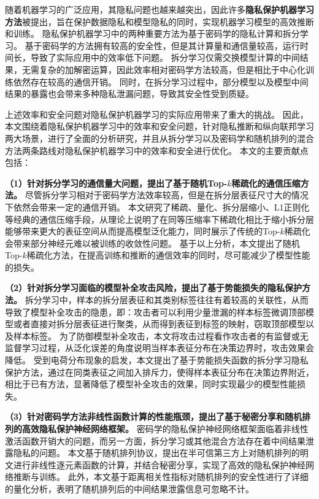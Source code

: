 \cleardoublepage
{}
随着机器学习的广泛应用，其隐私问题也越来越突出，因此许多\textbf{隐私保护机器学习方法}被提出，旨在保护数据隐私和模型隐私的同时，实现机器学习模型的高效推断和训练。
%
隐私保护机器学习中的两种重要方法为基于密码学的隐私计算和拆分学习。
基于密码学的方法拥有较高的安全性，但是其计算量和通信量较高，运行时间长，导致了实际应用中的效率低下问题。
拆分学习仅需交换模型计算的中间结果，无需复杂的加解密运算，因此效率相对密码学方法较高，但是相比于中心化训练依然存在较高的通信开销。
同时，在拆分学习过程中，部分模型以及模型中间结果的暴露也会带来多种隐私泄漏问题，导致其安全性受到质疑。
%

上述效率和安全问题对隐私保护机器学习的实际应用带来了重大的挑战。
%
因此，本文围绕着隐私保护机器学习中的效率和安全问题，针对隐私推断和纵向联邦学习两大场景，进行了全面的分析研究，并且从拆分学习以及密码学和随机排列的混合方法两条路线对隐私保护机器学习中的效率和安全进行优化。
%
本文的主要贡献点包括：


\textbf{（1）针对拆分学习的通信量大问题，提出了基于随机Top-$k$稀疏化的通信压缩方法。}
尽管拆分学习相对于密码学方法效率较高，但是在拆分层表征尺寸大的情况下依然会带来一定的通信开销。
%
本文研究了稀疏、量化、拆分层缩小、L1正则化等经典的通信压缩手段，从理论上说明了在同等压缩率下稀疏化相比于缩小拆分层能够带来更大的表征空间从而提高模型泛化能力，同时展示了传统的Top-$k$稀疏化会带来部分神经元难以被训练的收敛性问题。
%
基于以上分析，本文提出了随机Top-$k$稀疏化方法，在提高训练和推断的通信效率的同时，尽可能减少了模型性能的损失。

\textbf{（2）针对拆分学习面临的模型补全攻击风险，提出了基于势能损失的隐私保护方法。}
拆分学习中，样本的拆分层表征和其类别标签往往有着较高的关联性，从而导致了模型补全攻击的隐患，即：攻击者可以利用少量泄漏的样本标签微调顶部模型或者直接对拆分层表征进行聚类，从而得到表征到标签的映射，窃取顶部模型以及样本标签。
%
为了防御模型补全攻击，本文将攻击过程看作攻击者的有监督或无监督学习过程，从泛化误差的角度说明当样本表征分布在决策边界时，攻击效果会降低。
%
受到电荷分布现象的启发，本文提出了基于势能损失函数的拆分学习隐私保护方法，通过在同类表征之间加入排斥力，使得样本表征分布在决策边界附近，相比于已有方法，显著降低了模型补全攻击的效果，同时实现最少的模型性能损失。
%

\textbf{（3）针对密码学方法非线性函数计算的性能瓶颈，提出了基于秘密分享和随机排列的高效隐私保护神经网络框架。}
密码学的隐私保护神经网络框架面临着非线性激活函数开销大的问题，而另一方面，拆分学习或其他混合方法存在着中间结果泄露隐私的问题。
%
本文基于随机排列协议，提出在半可信第三方上对随机排列的明文进行非线性逐元素函数的计算，并结合秘密分享，实现了高效的隐私保护神经网络推断与训练。%
%
此外，本文基于距离相关性指标对随机排列的安全性进行了详细的量化分析，表明了随机排列后的中间结果泄露信息可忽略不计。


